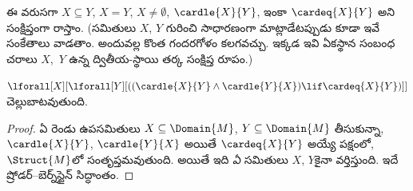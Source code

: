 \documentclass[../../../include/open-logic-section]{subfiles}
\begin{document}
ఈ  వరుసగా $X \subseteq Y$,
$X = Y$, $X \neq \emptyset$, $\cardle{X}{Y}$, ఇంకా
$\cardeq{X}{Y}$ అని సంక్షిప్తంగా రాస్తాం. (సమితులు $X$, $Y$ గురించి
సాధారణంగా మాట్లాడేటప్పుడు కూడా ఇవే సంకేతాలు వాడతాం. అందువల్ల
కొంత గందరగోళం కలగవచ్చు. ఇక్కడ ఇవి ఏకస్థాన సంబంధ చరాలు
$X$,~$Y$ ఉన్న ద్వితీయ-స్థాయి తర్క
 సంక్షిప్త రూపం.)

\begin{prop}
 $\lforall[X][\lforall[Y][((\cardle{X}{Y} \land
    \cardle{Y}{X}) \lif \cardeq{X}{Y})]]$ చెల్లుబాటవుతుంది.
\end{prop}

\begin{proof}
ఏ రెండు ఉపసమితులు $X \subseteq \Domain{M}$, $Y \subseteq \Domain{M}$ తీసుకున్నా,
$\cardle{X}{Y}$, $\cardle{Y}{X}$ అయితే $\cardeq{X}{Y}$ అయ్యే
పక్షంలో,  ~$\Struct{M}$లో
సంతృప్తమవుతుంది. అయితే ఇది \emph{ఏ} సమితులు $X$, $Y$కైనా
వర్తిస్తుంది. ఇదే ష్రోడర్--బెర్న్‌స్టైన్ సిద్ధాంతం.
\end{proof}
\end{document}
